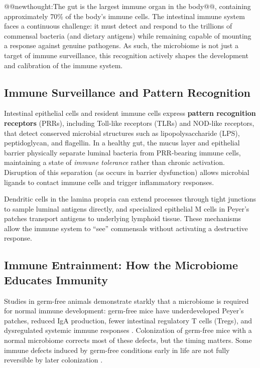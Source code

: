 \documentclass{tufte-handout}
\makeatletter
\def\newthought#1{@@newthought:#1@@}
\makeatother
\begin{document}
\newthought{The gut is the largest immune organ in the body}, containing approximately 70\% of the body's immune cells. The intestinal immune system faces a continuous challenge: it must detect and respond to the trillions of commensal bacteria (and dietary antigens) while remaining capable of mounting a response against genuine pathogens. As such, the microbiome is not just a target of immune surveillance, this recognition actively shapes the development and calibration of the immune system.

\subsection{Immune Surveillance and Pattern Recognition}

Intestinal epithelial cells and resident immune cells express \textbf{pattern recognition receptors} (PRRs), including Toll-like receptors (TLRs) and NOD-like receptors, that detect conserved microbial structures such as lipopolysaccharide (LPS), peptidoglycan, and flagellin. In a healthy gut, the mucus layer and epithelial barrier physically separate luminal bacteria from PRR-bearing immune cells, maintaining a state of \textit{immune tolerance} rather than chronic activation. Disruption of this separation (as occurs in barrier dysfunction) allows microbial ligands to contact immune cells and trigger inflammatory responses.

Dendritic cells in the lamina propria can extend processes through tight junctions to sample luminal antigens directly, and specialized epithelial M cells in Peyer's patches transport antigens to underlying lymphoid tissue. These mechanisms allow the immune system to ``see'' commensals without activating a destructive response.

\subsection{Immune Entrainment: How the Microbiome Educates Immunity}

Studies in germ-free animals demonstrate starkly that a microbiome is required for normal immune development: germ-free mice have underdeveloped Peyer's patches, reduced IgA production, fewer intestinal regulatory T cells (Tregs), and dysregulated systemic immune responses \citep{hooperInteractionsMicrobiotaImmune2012}. Colonization of germ-free mice with a normal microbiome corrects most of these defects, but the timing matters. Some immune defects induced by germ-free conditions early in life are not fully reversible by later colonization \citep{olszakMicrobialExposureEarly2012}.
\end{document}
